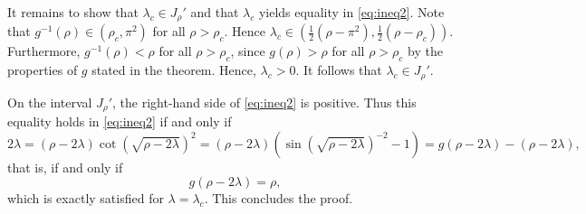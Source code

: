 \documentclass[11pt]{article}
\theoremstyle{plain}
\begin{document}
\begin{appendix}
It remains to show that $\lambda_c \in J_\rho'$ and that $\lambda_c$ yields equality in \eqref{eq:ineq2}. Note that $g^{-1}(\rho) \in (\rho_c,\pi^2)$ for all $\rho> \rho_c$. Hence $\lambda_c \in (\frac12(\rho-\pi^2),\frac12(\rho-\rho_c))$. Furthermore, $g^{-1}(\rho) < \rho$ for all $\rho > \rho_c$, since $g(\rho) > \rho$ for all $\rho>\rho_c$ by the properties of $g$ stated in the theorem. Hence, $\lambda_c > 0$. It follows that $\lambda_c \in J_\rho'$.

On the interval $J_\rho'$, the right-hand side of \eqref{eq:ineq2} is positive. Thus this equality holds in \eqref{eq:ineq2} if and only if
\[
2\lambda = (\rho-2\lambda)\cot(\sqrt{\rho-2\lambda})^2 = (\rho-2\lambda)(\sin(\sqrt{\rho-2\lambda})^{-2} - 1) = g(\rho-2\lambda) - (\rho-2\lambda),
\]
that is, if and only if
\[
g(\rho-2\lambda) = \rho,
\]
which is exactly satisfied for $\lambda = \lambda_c$. This concludes the proof.



\end{appendix}
\end{document}
